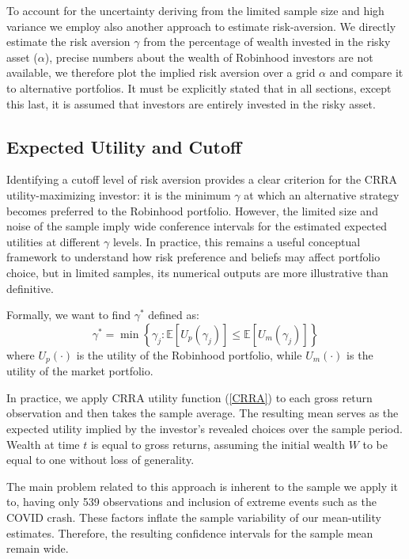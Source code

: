 To account for the uncertainty deriving from the limited sample size and high variance we employ also another approach to estimate risk-aversion. 
We directly estimate the risk aversion $\gamma$ from the percentage of wealth invested in the risky asset ($\alpha$), 
precise numbers about the wealth of Robinhood investors are not available, we therefore plot the implied risk aversion over a grid $\alpha$ and compare it to alternative portfolios.
It must be explicitly stated that in all sections, except this last, it is assumed that investors are entirely invested in the risky asset.

\subsection{Expected Utility and Cutoff}
\label{sec:cutoff}
Identifying a cutoff level of risk aversion provides a clear criterion for the CRRA utility-maximizing investor: 
it is the minimum $\gamma$ at which an alternative strategy becomes preferred to the Robinhood portfolio.
However, the limited size and noise of the sample imply wide conference intervals for the estimated expected utilities at different $\gamma$ levels.
In practice, this remains a useful conceptual framework to understand how risk preference and beliefs may affect portfolio choice, but in limited samples, its numerical outputs are more illustrative than definitive.

Formally, we want to find $\gamma^*$ defined as:
\begin{equation}
    \gamma^* = \min\left\{ \gamma_j : \mathbb{E}[U_p(\gamma_j)] \leq \mathbb{E}[U_m(\gamma_j)] \right\}
\label{gamma_cutoff}
\end{equation}
where $U_p(\cdot)$ is the utility of the Robinhood portfolio, while $U_m(\cdot)$ is the utility of the market portfolio.

In practice, we apply CRRA utility function (\ref{CRRA}) to each gross return observation and then takes the sample average.
The resulting mean serves as the expected utility implied by the investor's revealed choices over the sample period.
Wealth at time $t$ is equal to gross returns, assuming the initial wealth $W$ to be equal to one without loss of generality.


The main problem related to this approach is inherent to the sample we apply it to, having only 539 observations and inclusion of extreme events such as the COVID crash. 
These factors inflate the sample variability of our mean-utility estimates. 
Therefore, the resulting confidence intervals for the sample mean remain wide. 

